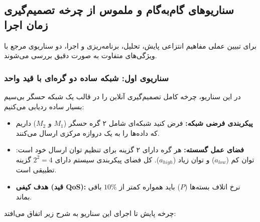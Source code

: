 \documentclass[oneside,openany,phd]{TMU-Thesis}
\begin{document}
\subsection{سناریوهای گام‌به‌گام و ملموس از چرخه تصمیم‌گیری زمان اجرا}

\label{subsec:running_example}

برای تبیین عملی مفاهیم انتزاعی پایش، تحلیل، برنامه‌ریزی و اجرا، دو سناریوی مرجع با ویژگی‌های متفاوت به صورت دقیق بررسی می‌شوند.



\subsubsection{سناریوی اول: شبکه ساده دو گره‌ای با قید واحد}

در این سناریو، چرخه کامل تصمیم‌گیری آنلاین را در قالب یک شبکه حسگر بی‌سیم بسیار ساده ردیابی می‌کنیم:

\begin{itemize}

\item \textbf{پیکربندی فرضی شبکه:} فرض کنید شبکه‌ای شامل ۲ گره حسگر ($M_1$ و $M_2$) داریم که داده‌ها را به یک دروازه مرکزی ارسال می‌کنند.

\item \textbf{فضای عمل گسسته:} هر گره دارای ۲ گزینه برای تنظیم توان ارسال خود است: توان کم ($a_{low}$) و توان زیاد ($a_{high}$). کل فضای پیکربندی سیستم دارای $2^2 = 4$ گزینه تطبیقی است.

\item \textbf{هدف کیفی (قید QoS):} نرخ اتلاف بسته‌ها ($P$) باید همواره کمتر از $10\%$ باقی بماند.

\end{itemize}



چرخه پایش تا اجرای این سناریو به شرح زیر اتفاق می‌افتد:
\end{document}
